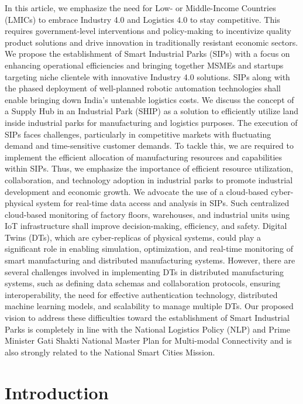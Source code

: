 \documentclass[paper=a4wide, fontsize=12pt]{scrartcl}
\begin{document}
In this article, we emphasize the need for Low- or Middle-Income Countries (LMICs) to embrace Industry 4.0 and Logistics 4.0 to stay competitive. This requires government-level interventions and policy-making to incentivize quality product solutions and drive innovation in traditionally resistant economic sectors. We propose the establishment of Smart Industrial Parks (SIPs) with a focus on enhancing operational efficiencies and bringing together MSMEs and startups targeting niche clientele with innovative Industry 4.0 solutions. SIPs along with the phased deployment of well-planned robotic automation technologies shall enable bringing down India's untenable logistics costs. We discuss the concept of a Supply Hub in an Industrial Park (SHIP) as a solution to efficiently utilize land inside industrial parks for manufacturing and logistics purposes. The execution of SIPs faces challenges, particularly in competitive markets with fluctuating demand and time-sensitive customer demands. To tackle this, we are required to implement the efficient allocation of manufacturing resources and capabilities within SIPs. Thus, we emphasize the importance of efficient resource utilization, collaboration, and technology adoption in industrial parks to promote industrial development and economic growth. We advocate the use of a cloud-based cyber-physical system for real-time data access and analysis in SIPs. Such centralized cloud-based monitoring of factory floors, warehouses, and industrial units using IoT infrastructure shall improve decision-making, efficiency, and safety. Digital Twins (DTs), which are cyber-replicas of physical systems, could play a significant role in enabling simulation, optimization, and real-time monitoring of smart manufacturing and distributed manufacturing systems. However, there are several challenges involved in implementing DTs in distributed manufacturing systems, such as defining data schemas and collaboration protocols, ensuring interoperability, the need for effective authentication technology, distributed machine learning models, and scalability to manage multiple DTs. Our proposed vision to address these difficulties toward the establishment of Smart Industrial Parks is completely in line with the National Logistics Policy (NLP) and Prime Minister Gati Shakti National Master Plan for Multi-modal Connectivity and is also strongly related to the National Smart Cities Mission.

\section{Introduction}
\end{document}
